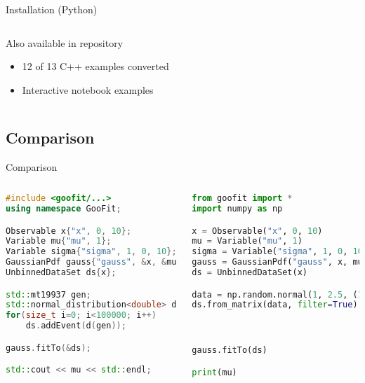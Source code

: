 \documentclass[aspectratio=169, smaller]{beamer}
\begin{document}
\begin{frame}{Installation (Python)}
\begin{columns}[c]
        \begin{block}{Also available in repository}
            \begin{itemize}
                \item 12 of 13 C++ examples converted
                \item Interactive notebook examples
            \end{itemize}
        \end{block}
    \end{columns}
\end{frame}


\subsection{Comparison}
\begin{frame}[fragile]{Comparison}
    \begin{columns}[c]
        \begin{lstlisting}[language=C++]
#include <goofit/...>
using namespace GooFit;

Observable x{"x", 0, 10};
Variable mu{"mu", 1};
Variable sigma{"sigma", 1, 0, 10};
GaussianPdf gauss{"gauss", &x, &mu, &sigma};
UnbinnedDataSet ds{x};

std::mt19937 gen;
std::normal_distribution<double> d{1, 2.5};
for(size_t i=0; i<100000; i++)
    ds.addEvent(d(gen));

gauss.fitTo(&ds);

std::cout << mu << std::endl;
\end{lstlisting}
        \begin{lstlisting}[language=Python] 
from goofit import *
import numpy as np

x = Observable("x", 0, 10)
mu = Variable("mu", 1)
sigma = Variable("sigma", 1, 0, 10)
gauss = GaussianPdf("gauss", x, mu, sigma)
ds = UnbinnedDataSet(x)

data = np.random.normal(1, 2.5, (100000,1))
ds.from_matrix(data, filter=True)



gauss.fitTo(ds)

print(mu)
        \end{lstlisting}
    \end{columns}
\end{frame}
\end{document}
